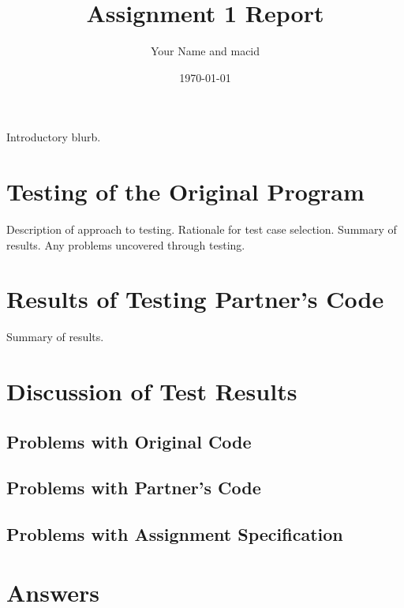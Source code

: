 \documentclass[12pt]{article}
\title{Assignment 1 Report}
\author{Your Name and macid}
\date{\today}
\begin{document}
\maketitle

Introductory blurb.

\section{Testing of the Original Program}

Description of approach to testing.  Rationale for test case selection.  Summary
of results.  Any problems uncovered through testing.

\section{Results of Testing Partner's Code}

Summary of results.

\section{Discussion of Test Results}

\subsection{Problems with Original Code}

\subsection{Problems with Partner's Code}

\subsection{Problems with Assignment Specification}

\section{Answers}
\end{document}
